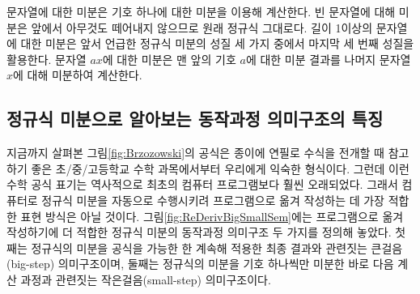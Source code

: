 문자열에 대한 미분은 기호 하나에 대한 미분을 이용해 계산한다.
빈 문자열에 대해 미분은 앞에서 아무것도 떼어내지 않으므로
원래 정규식 그대로다. 길이 1이상의 문자열에 대한 미분은 앞서 언급한
정규식 미분의 성질 세 가지 중에서 마지막 세 번째 성질을 활용한다.
문자열 $ax$에 대한 미분은 맨 앞의 기호 $a$에 대한 미분 결과를
나머지 문자열 $x$에 대해 미분하여 계산한다.

\subsection{정규식 미분으로 알아보는 동작과정 의미구조의 특징}
지금까지 살펴본 그림\;\ref{fig:Brzozowski}의 공식은
종이에 연필로 수식을 전개할 때 참고하기 좋은 초/중/고등학교
수학 과목에서부터 우리에게 익숙한 형식이다. 그런데 이런 수학 공식 표기는
역사적으로 최초의 컴퓨터 프로그램\cite{Lovelace1843notes}보다 훨씬
오래되었다. 그래서 컴퓨터로 정규식 미분을 자동으로 수행시키려
프로그램으로 옮겨 작성하는 데 가장 적합한 표현 방식은 아닐 것이다.
그림\;\ref{fig:ReDerivBigSmallSem}에는 프로그램으로 옮겨 작성하기에
더 적합한 정규식 미분의 동작과정 의미구조 두 가지를 정의해 놓았다.
첫째는 정규식의 미분을 공식을 가능한 한 계속해 적용한 최종 결과와
관련짓는
%
%
%
%
큰걸음(big-step) 의미구조이며, 둘째는 정규식의 미분을 기호
하나씩만 미분한 바로 다음 계산 과정과 관련짓는
%
%
%
%
작은걸음(small-step)
의미구조이다.

